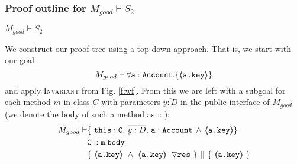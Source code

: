  \subsubsection{Proof outline for $M_{good} \vdash S_2$}



\begin{lemma}
\label{lemma:exampleKeyProtect}
$M_{good} \vdash S_2$
\end{lemma}
\begin{proofO}
We construct our proof tree using a top down approach.  That is, we start with our goal
$$M_{good} \vdash \forall {\mbox{\normalfont{\texttt{a}}}:\mbox{\normalfont{\texttt{Account}}}}.{{\{}}{\langle\!\!\langle \mbox{\normalfont{\texttt{\mbox{\normalfont{\texttt{a.key}}}}}} \rangle\!\!\rangle}{{\}}}$$
and apply  \textsc{Invariant} from Fig. \ref{f:wf}.
From this we are left with a subgoal for each method $m$ in  class $C$ with parameters $\overline{y:D}$ in the public interface of $M_{good}$ (we denote the body of such a method as ::.):
\small
\begin{align*}
M_{good} \vdash
		& \{ \ \prg{this}:\prg{C},\, \overline{y:D},\, \prg{a}:\prg{Account}\, \wedge\,
		   {\inside{\prg{a.key}}}\} \\
		& \prg{C}::\prg{m}.\prg{body}\ \\
		& \{\ {\inside{\prg{a.key}}}\ \wedge\ {\PushASLong {\prg{res}} {\inside{\prg{a.key}}}}\ \}\ ||\ \{\ {\inside{\prg{a.key}}} \ 			\} 
\end{align*}
\normalsize
{}


\end{proofO}
